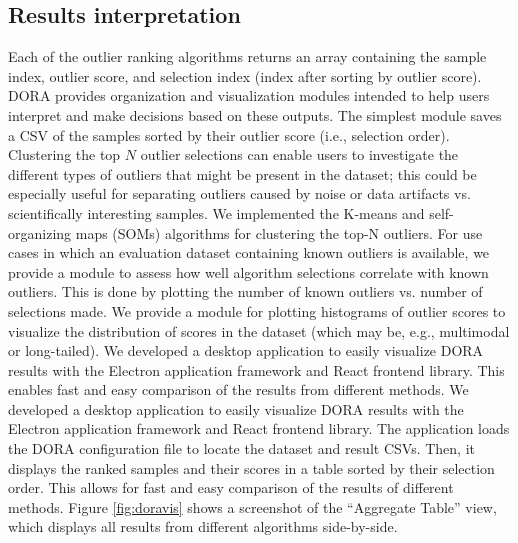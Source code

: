 \documentclass[utf8]{frontiersFPHY} %
\begin{document}
\subsection{Results interpretation}
Each of the outlier ranking algorithms returns an array containing the sample
index, outlier score, and selection index (index after sorting
by outlier score). DORA provides organization and visualization modules
intended to help users interpret and make decisions based on these outputs.
The simplest
module saves a CSV of the samples sorted by their outlier score 
(i.e., selection order). Clustering the top
$N$ outlier selections can enable users to investigate the different types of 
outliers that might be present in the dataset; this could be especially useful
for separating outliers caused by noise or data artifacts vs. scientifically 
interesting samples. We implemented the K-means and self-organizing maps 
(SOMs) algorithms for clustering the top-N outliers. For use cases in which an
evaluation dataset containing known outliers is available, we provide a module
to assess how well algorithm selections correlate with known outliers. This is
done by plotting the number of known outliers vs. number of selections made. 
We provide a module for plotting histograms of outlier scores to visualize the
distribution of scores in the dataset (which may be, e.g., multimodal or 
long-tailed). 
We developed a desktop application to easily visualize DORA results with the
Electron application framework and React frontend library. 
This enables fast and easy comparison of the results from
different methods. 
%
We developed a desktop application to easily visualize DORA results with the
Electron application framework and React frontend library. 
The application loads
the DORA configuration file to locate the dataset and result CSVs. Then,
it displays the ranked samples and their scores in a table sorted by their
selection order. This allows for fast and easy comparison of the results of
different methods. Figure \ref{fig:doravis} shows a screenshot of the
``Aggregate Table'' view, which displays all results from different algorithms
side-by-side.
\end{document}

